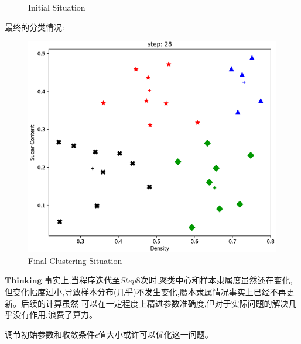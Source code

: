 \documentclass[homework]{IEEEtran}
\begin{document}
\begin{CJK}{UTF8}{gkai}
\begin{figure}[htb]
    \caption{Initial Situation}
    \label{fig15}
    \end{figure} \par
\newpage
最终的分类情况:
\begin{figure}[htb]
    \centerline{\includegraphics{Images/fig16.png}}
    \caption{Final Clustering Situation}
    \label{fig16}
    \end{figure} \par

$\mathbf{Thinking}$:事实上,当程序迭代至$Step 8$次时,聚类中心和样本隶属度虽然还在变化,
但变化幅度过小,导致样本分布(几乎)不发生变化,赝本隶属情况事实上已经不再更新。后续的计算虽然
可以在一定程度上精进参数准确度,但对于实际问题的解决几乎没有作用,浪费了算力。 \par
调节初始参数和收敛条件$\epsilon$值大小或许可以优化这一问题。
\end{CJK}

\clearpage
\end{document}
